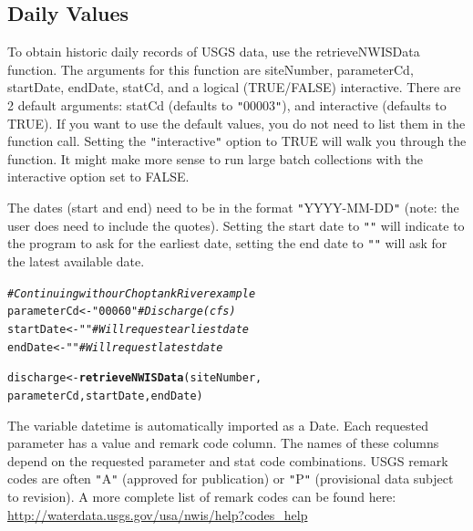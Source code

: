 \documentclass[a4paper,11pt]{article}\usepackage[]{graphicx}\usepackage[]{color}
\makeatletter
\newcommand{\hlstr}[1]{\textcolor[rgb]{0.192,0.494,0.8}{#1}}%
\newcommand{\hlcom}[1]{\textcolor[rgb]{0.678,0.584,0.686}{\textit{#1}}}%
\newcommand{\hlstd}[1]{\textcolor[rgb]{0.345,0.345,0.345}{#1}}%
\newcommand{\hlkwb}[1]{\textcolor[rgb]{0.69,0.353,0.396}{#1}}%
\newcommand{\hlkwd}[1]{\textcolor[rgb]{0.737,0.353,0.396}{\textbf{#1}}}%
\newenvironment{kframe}{%
 \def\at@end@of@kframe{}%
 \ifinner\ifhmode%
  \def\at@end@of@kframe{\end{minipage}}%
  \begin{minipage}{\columnwidth}%
 \fi\fi%
 \def\FrameCommand##1{\hskip\@totalleftmargin \hskip-\fboxsep
 \colorbox{shadecolor}{##1}\hskip-\fboxsep
     \hskip-\linewidth \hskip-\@totalleftmargin \hskip\columnwidth}%
 \MakeFramed {\advance\hsize-\width
   \@totalleftmargin\z@ \linewidth\hsize
   \@setminipage}}%
 {\par\unskip\endMakeFramed%
 \at@end@of@kframe}
\newenvironment{knitrout}{}{} %
\makeatother
\begin{document}
\subsection{Daily Values}
\label{sec:usgsDaily}
To obtain historic daily records of USGS data, use the retrieveNWISData function. The arguments for this function are siteNumber, parameterCd, startDate, endDate, statCd, and a logical (TRUE/FALSE) interactive. There are 2 default arguments: statCd (defaults to \texttt{"}00003\texttt{"}), and interactive (defaults to TRUE).  If you want to use the default values, you do not need to list them in the function call. Setting the \texttt{"}interactive\texttt{"} option to TRUE will walk you through the function. It might make more sense to run large batch collections with the interactive option set to FALSE. 

The dates (start and end) need to be in the format \texttt{"}YYYY-MM-DD\texttt{"} (note: the user does need to include the quotes).  Setting the start date to \texttt{"}\texttt{"} will indicate to the program to ask for the earliest date, setting the end date to \texttt{"}\texttt{"} will ask for the latest available date.

\begin{knitrout}
\color{fgcolor}\begin{kframe}
\begin{alltt}
\hlcom{# Continuing with our Choptank River example}
\hlstd{parameterCd} \hlkwb{<-} \hlstr{"00060"}  \hlcom{# Discharge (cfs)}
\hlstd{startDate} \hlkwb{<-} \hlstr{""}  \hlcom{# Will request earliest date}
\hlstd{endDate} \hlkwb{<-} \hlstr{""} \hlcom{# Will request latest date}

\hlstd{discharge} \hlkwb{<-} \hlkwd{retrieveNWISData}\hlstd{(siteNumber,}
                    \hlstd{parameterCd, startDate, endDate)}
\end{alltt}
\end{kframe}
\end{knitrout}


The variable datetime is automatically imported as a Date. Each requested parameter has a value and remark code column.  The names of these columns depend on the requested parameter and stat code combinations. USGS remark codes are often \texttt{"}A\texttt{"} (approved for publication) or \texttt{"}P\texttt{"} (provisional data subject to revision). A more complete list of remark codes can be found here:
\url{http://waterdata.usgs.gov/usa/nwis/help?codes_help}
\end{document}
